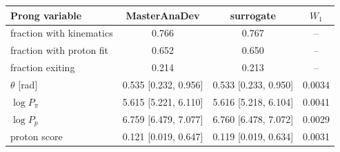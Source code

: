 \begin{tabular}{lccc}
\toprule
Prong variable & MasterAnaDev & surrogate & $W_1$ \\
\midrule
fraction with kinematics & 0.766 & 0.767 & -- \\
fraction with proton fit & 0.652 & 0.650 & -- \\
fraction exiting & 0.214 & 0.213 & -- \\
$\theta$ [rad] & 0.535 [0.232, 0.956] & 0.533 [0.233, 0.950] & 0.0034 \\
$\log P_\pi$ & 5.615 [5.221, 6.110] & 5.616 [5.218, 6.104] & 0.0041 \\
$\log P_p$ & 6.759 [6.479, 7.077] & 6.760 [6.478, 7.072] & 0.0029 \\
proton score & 0.121 [0.019, 0.647] & 0.119 [0.019, 0.634] & 0.0031 \\
\bottomrule
\end{tabular}
